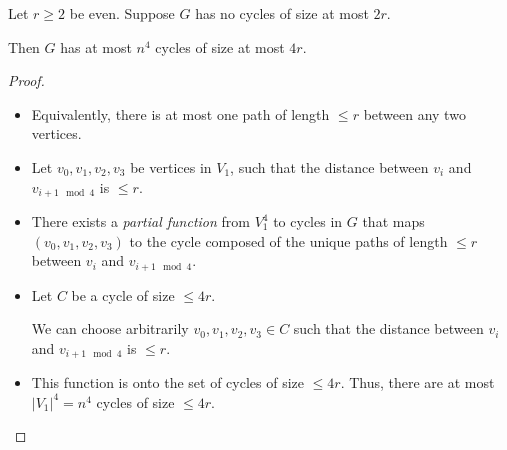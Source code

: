 \documentclass{beamer}
\theoremstyle{remark}
\begin{document}
\begin{frame}[allowframebreaks]
  \begin{lemma}
    Let $r \ge 2$ be even.
    Suppose $G$ has no cycles of size at most $2r$.

    Then $G$ has at most $n^4$ cycles of size at most $4r$.
  \end{lemma}

  \begin{proof}
    \begin{itemize}
      \item Equivalently, there is at most
            one path of length $\le r$ between any two vertices.

      \item Let $v_0, v_1, v_2, v_3$ be vertices in $V_1$, such that the
            distance between $v_i$ and $v_{i + 1 \mod 4}$ is $\le r$.

      \item There exists a \emph{partial function} from $V_1^4$ to cycles in $G$ that maps
            $(v_0, v_1, v_2, v_3)$ to the cycle composed of the unique paths of
            length $\le r$ between $v_i$ and $v_{i + 1 \mod 4}$.

      \item Let $C$ be a cycle of size $\le 4r$.

            We can choose arbitrarily $v_0, v_1, v_2, v_3 \in C$ such that
            the distance between $v_i$ and $v_{i + 1 \mod 4}$ is $\le r$.

      \item This function is onto the set of cycles of size $\le 4r$.
            Thus, there are at most $|V_1|^4 = n^4$ cycles of size $\le 4r$.

    \end{itemize}
  \end{proof}
\end{frame}
\end{document}
